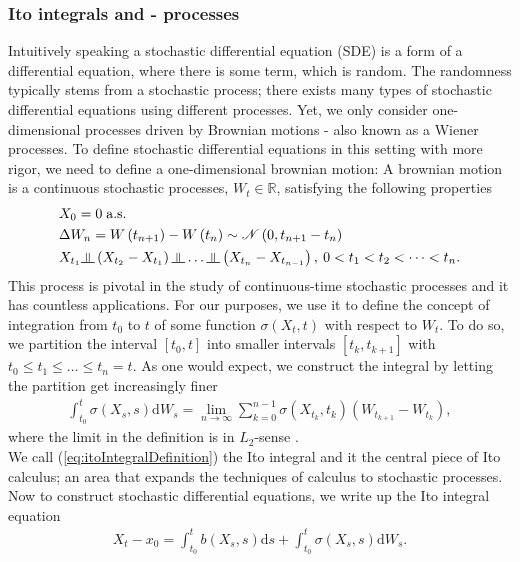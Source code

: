 \subsubsection{Ito integrals and - processes}
Intuitively speaking a stochastic differential equation (SDE) is a form of a differential equation, where there is some term, which is random. The randomness typically stems from a stochastic process; there exists many types of stochastic differential equations using different processes. Yet, we only consider one-dimensional processes driven by Brownian motions - also known as a Wiener processes. To define stochastic differential equations in this setting with more rigor, we need to define a one-dimensional brownian motion: A brownian motion is a continuous stochastic processes, $W_t\in\mathbb{R}$, satisfying the following properties
\begin{align}
    &X_0 = 0 \; \textrm{a.s.}\label{eq:brownianMotion1}\\
    &\Delta W_n = W\left(t_{n + 1}\right) - W\left(t_{n}\right)\sim\mathcal{N}\left(0, t_{n + 1} - t_{n}\right) \label{eq:brownianMotion2}\\
    &X_{t_1}\indep \left(X_{t_2} - X_{t_1}\right)\indep \dots \indep \left(X_{t_n} - X_{t_{n - 1}}\right), \: 0 < t_1 < t_2 < \dots < t_n. \label{eq:brownianMotion3}
\end{align}
This process is pivotal in the study of continuous-time stochastic processes and it has countless applications. For our purposes, we use it to define the concept of integration from $t_0$ to $t$ of some function $\sigma(X_t, t)$ with respect to $W_t$. To do so, we partition the interval $[t_0, t]$ into smaller intervals $[t_k, t_{k + 1}]$ with $t_0 \leq t_1 \leq \dots \leq t_n = t$. As one would expect, we construct the integral by letting the partition get increasingly finer
\begin{align}
    \int_{t_0}^t \sigma(X_s, s) \mathrm{d}W_s = \lim_{n \to \infty}\sum_{k = 0}^{n - 1} \sigma\left(X_{t_k}, t_k\right)\left(W_{t_{k + 1}} - W_{t_k}\right),\label{eq:itoIntegralDefinition}
\end{align}
where the limit in the definition is in $L_2$-sense \cite[equation 4.6]{Srkk2019}. \\
We call (\ref{eq:itoIntegralDefinition}) the Ito integral and it the central piece of Ito calculus; an area that expands the techniques of calculus to stochastic processes. Now to construct stochastic differential equations, we write up the Ito integral equation
\begin{align}
    X_t - x_0 = \int_{t_0}^t b(X_s, s)\mathrm{d}s + \int_{t_0}^t \sigma(X_s, s)\mathrm{d}W_s. \label{eq:itoIntegralEquation}
\end{align}
